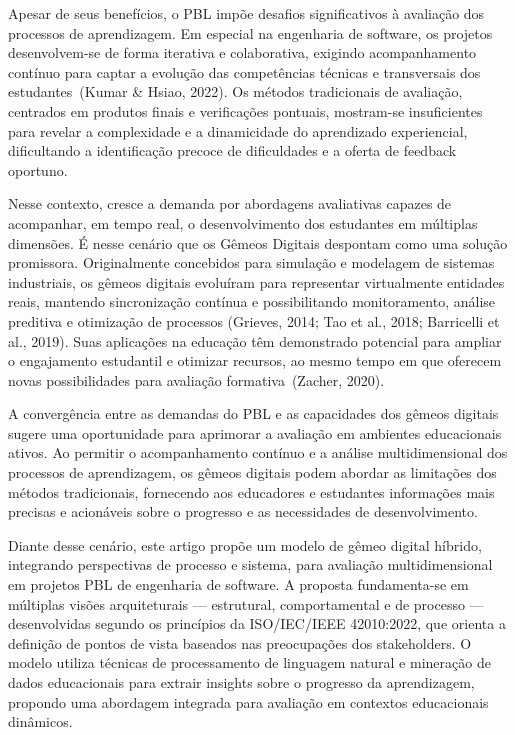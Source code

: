 \documentclass[english, spanish, brazilian]{modelo_dt}
\begin{document}
Apesar de seus benefícios, o PBL impõe desafios significativos à avaliação dos
processos de aprendizagem. Em especial na engenharia de software, os projetos
desenvolvem-se de forma iterativa e colaborativa, exigindo acompanhamento
contínuo para captar a evolução das competências técnicas e transversais dos
estudantes~(Kumar \& Hsiao, 2022). Os métodos tradicionais de avaliação,
centrados em produtos finais e verificações pontuais, mostram-se insuficientes
para revelar a complexidade e a dinamicidade do aprendizado experiencial,
dificultando a identificação precoce de dificuldades e a oferta de feedback
oportuno.

Nesse contexto, cresce a demanda por abordagens avaliativas capazes de
acompanhar, em tempo real, o desenvolvimento dos estudantes em múltiplas
dimensões. É nesse cenário que os Gêmeos Digitais despontam como uma solução
promissora. Originalmente concebidos para simulação e modelagem de sistemas
industriais, os gêmeos digitais evoluíram para representar virtualmente
entidades reais, mantendo sincronização contínua e possibilitando
monitoramento, análise preditiva e otimização de processos (Grieves, 2014; Tao
et al., 2018; Barricelli et al., 2019). Suas aplicações na educação têm
demonstrado potencial para ampliar o engajamento estudantil e otimizar
recursos, ao mesmo tempo em que oferecem novas possibilidades para avaliação
formativa~(Zacher, 2020).

A convergência entre as demandas do PBL e as capacidades dos gêmeos digitais
sugere uma oportunidade para aprimorar a avaliação em ambientes
educacionais ativos. Ao permitir o acompanhamento contínuo e a análise
multidimensional dos processos de aprendizagem, os gêmeos digitais podem
abordar as limitações dos métodos tradicionais, fornecendo aos educadores e
estudantes informações mais precisas e acionáveis sobre o progresso e as
necessidades de desenvolvimento.

Diante desse cenário, este artigo propõe um modelo de gêmeo digital híbrido,
integrando perspectivas de processo e sistema, para avaliação multidimensional
em projetos PBL de engenharia de software. A proposta fundamenta-se em múltiplas
visões arquiteturais — estrutural, comportamental e de processo — desenvolvidas segundo os princípios da ISO/IEC/IEEE 42010:2022, que orienta a definição de pontos de vista baseados nas preocupações dos stakeholders. O modelo utiliza
técnicas de processamento de linguagem natural e mineração de dados
educacionais para extrair insights sobre o progresso da aprendizagem,
propondo uma abordagem integrada para avaliação em contextos
educacionais dinâmicos.
\end{document}
